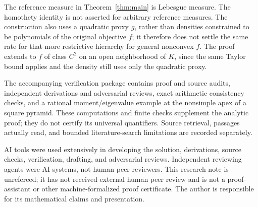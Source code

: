 \documentclass[11pt]{article}
\begin{document}
The reference measure in Theorem~\ref{thm:main} is Lebesgue measure.
The homothety identity is not asserted for arbitrary reference
measures. The construction also uses a quadratic proxy $g$, rather
than densities constrained to be polynomials of the original
objective $f$; it therefore does not settle the same rate for that
more restrictive hierarchy for general nonconvex $f$.
The proof extends to $f$ of class $C^2$ on an open neighborhood of
$K$, since the same Taylor bound applies and the density still uses
only the quadratic proxy.

The accompanying verification package contains proof and source
audits, independent derivations and adversarial reviews, exact
arithmetic consistency checks, and a rational moment/eigenvalue
example at the nonsimple apex of a square pyramid. These computations
and finite checks supplement the analytic proof; they do not certify
its universal quantifiers. Source retrieval, passages actually read,
and bounded literature-search limitations are recorded separately.

AI tools were used extensively in developing the solution,
derivations, source checks, verification, drafting, and adversarial
reviews. Independent reviewing agents were AI systems, not human
peer reviewers. This research note is unrefereed; it has not received
external human peer review and is not a proof-assistant or other
machine-formalized proof certificate. The author is responsible for
its mathematical claims and presentation.
\end{document}
